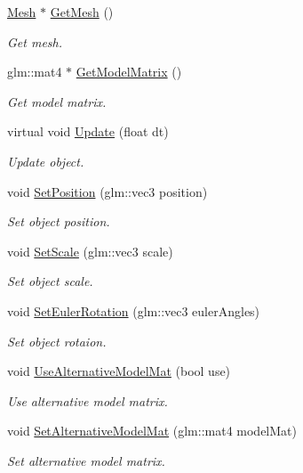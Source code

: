 \begin{DoxyCompactItemize}
\hyperlink{class_mesh}{Mesh} $\ast$ \hyperlink{class_object_ac59efbef5ea2a39576d7a057eb5e11ac}{Get\+Mesh} ()
\begin{DoxyCompactList}\small\item\em Get mesh. \end{DoxyCompactList}\item 
glm\+::mat4 $\ast$ \hyperlink{class_object_a58e26d2cc568b514884336ed279dc00c}{Get\+Model\+Matrix} ()
\begin{DoxyCompactList}\small\item\em Get model matrix. \end{DoxyCompactList}\item 
virtual void \hyperlink{class_object_a03bd9ae689e9535934f46222644f44aa}{Update} (float dt)
\begin{DoxyCompactList}\small\item\em Update object. \end{DoxyCompactList}\item 
void \hyperlink{class_object_adbffb47c9daf536f5ccd668d060a0490}{Set\+Position} (glm\+::vec3 position)
\begin{DoxyCompactList}\small\item\em Set object position. \end{DoxyCompactList}\item 
void \hyperlink{class_object_a08faf59cf967fae31dd3ed0aea43a372}{Set\+Scale} (glm\+::vec3 scale)
\begin{DoxyCompactList}\small\item\em Set object scale. \end{DoxyCompactList}\item 
void \hyperlink{class_object_a0aaf9cce0a37d5bb0af6eb11ab8dce64}{Set\+Euler\+Rotation} (glm\+::vec3 euler\+Angles)
\begin{DoxyCompactList}\small\item\em Set object rotaion. \end{DoxyCompactList}\item 
void \hyperlink{class_object_a5930b30196790ae109835e4f24a85b29}{Use\+Alternative\+Model\+Mat} (bool use)
\begin{DoxyCompactList}\small\item\em Use alternative model matrix. \end{DoxyCompactList}\item 
void \hyperlink{class_object_a178b374670d4681c61556a352276f96a}{Set\+Alternative\+Model\+Mat} (glm\+::mat4 model\+Mat)
\begin{DoxyCompactList}\small\item\em Set alternative model matrix. \end{DoxyCompactList}\item 

\end{DoxyCompactItemize}
